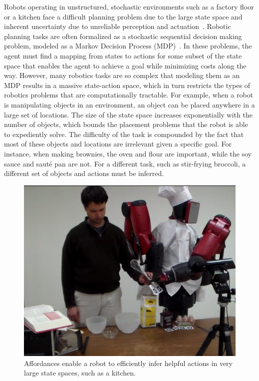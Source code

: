 \documentclass[letterpaper]{article}
\begin{document}
Robots operating in unstructured, stochastic environments such as a
factory floor or a kitchen face a difficult planning problem due to
the large state space and inherent uncertainty due to unreliable
perception and actuation~\citep{bollini12,knepper13}.  Robotic
planning tasks are often formalized as a stochastic sequential
decision making problem, modeled as a Markov Decision Process
(MDP)~\citep{thrun2008probabilistic}. In these problems, the agent
must find a mapping from states to actions for some subset of the
state space that enables the agent to achieve a goal while minimizing
costs along the way. However, many robotics tasks are so complex that
modeling them as an MDP results in a massive state-action space, which
in turn restricts the types of robotics problems that are
computationally tractable. For example, when a robot is manipulating
objects in an environment, an object can be placed anywhere in a large
set of locations. The size of the state space increases exponentially
with the number of objects, which bounds the placement problems that
the robot is able to expediently solve. The difficulty of the task is compounded
by the fact that most of these objects and locations are irrelevant given a specific goal. For instance, when making brownies,
the oven and flour are important, while the soy sauce and saut\'{e}
pan are not.  For a different task, such as stir-frying broccoli, a
different set of objects and actions must be inferred.

\begin{figure}
\centering
\includegraphics[width=0.75\linewidth]{figures/baxter.png}%
  \caption{Affordances enable a robot to efficiently infer helpful actions in
    very large state spaces, such as a kitchen.}
  \label{fig:baxter_results}
\end{figure}
\end{document}
